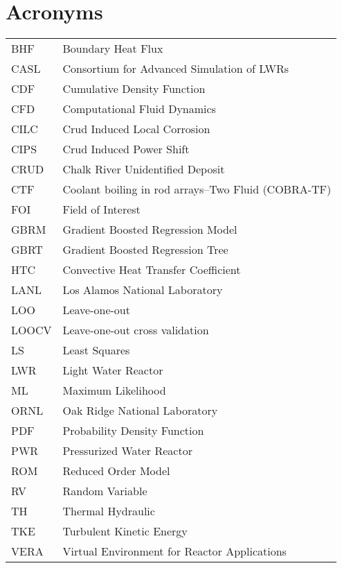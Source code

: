 

\section*{Acronyms}
\begin{tabular}{l l}
BHF & Boundary Heat Flux \\
CASL & Consortium for Advanced Simulation of LWRs \\
CDF  & Cumulative Density Function \\
CFD &  Computational Fluid Dynamics \\
CILC & Crud Induced Local Corrosion \\
CIPS & Crud Induced Power Shift \\
CRUD & Chalk River Unidentified Deposit \\
CTF &  Coolant boiling in rod arrays–Two Fluid (COBRA-TF) \\
FOI &  Field of Interest \\
GBRM & Gradient Boosted Regression Model \\
GBRT & Gradient Boosted Regression Tree \\
HTC  & Convective Heat Transfer Coefficient \\
LANL & Los Alamos National Laboratory \\
LOO & Leave-one-out \\
LOOCV & Leave-one-out cross validation \\
LS  &  Least Squares \\
LWR & Light Water Reactor \\
ML  &  Maximum Likelihood \\
ORNL & Oak Ridge National Laboratory \\
PDF  &  Probability Density Function \\
PWR  & Pressurized Water Reactor \\
ROM &  Reduced Order Model \\
RV  & Random Variable \\
TH  &  Thermal Hydraulic \\
TKE &  Turbulent Kinetic Energy \\
VERA & Virtual Environment for Reactor Applications \\
\end{tabular}

